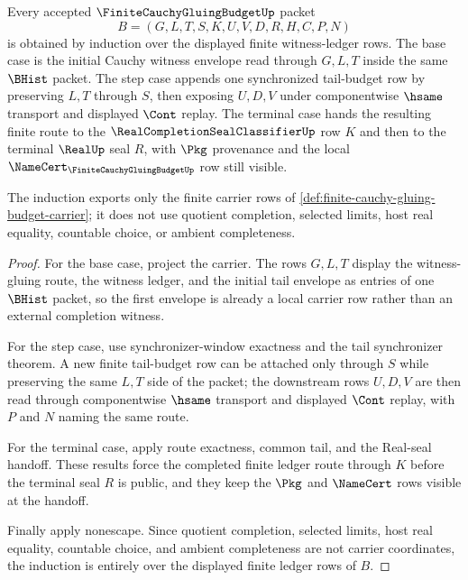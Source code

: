\begin{theorem}
\label{thm:finite-cauchy-gluing-budget-induction}
Every accepted $\FiniteCauchyGluingBudgetUp$ packet
$$
B=(G,L,T,S,K,U,V,D,R,H,C,P,N)
$$
is obtained by induction over the displayed finite witness-ledger rows. The base case is the initial Cauchy witness envelope read through $G,L,T$ inside the same $\BHist$ packet. The step case appends one synchronized tail-budget row by preserving $L,T$ through $S$, then exposing $U,D,V$ under componentwise $\hsame$ transport and displayed $\Cont$ replay. The terminal case hands the resulting finite route to the $\RealCompletionSealClassifierUp$ row $K$ and then to the terminal $\RealUp$ seal $R$, with $\Pkg$ provenance and the local $\NameCert_{\FiniteCauchyGluingBudgetUp}$ row still visible.

The induction exports only the finite carrier rows of \autoref{def:finite-cauchy-gluing-budget-carrier}; it does not use quotient completion, selected limits, host real equality, countable choice, or ambient completeness.
\end{theorem}
\begin{proof}
For the base case, project the carrier. The rows $G,L,T$ display the witness-gluing route, the witness ledger, and the initial tail envelope as entries of one $\BHist$ packet, so the first envelope is already a local carrier row rather than an external completion witness.

For the step case, use synchronizer-window exactness and the tail synchronizer theorem. A new finite tail-budget row can be attached only through $S$ while preserving the same $L,T$ side of the packet; the downstream rows $U,D,V$ are then read through componentwise $\hsame$ transport and displayed $\Cont$ replay, with $P$ and $N$ naming the same route.

For the terminal case, apply route exactness, common tail, and the Real-seal handoff. These results force the completed finite ledger route through $K$ before the terminal seal $R$ is public, and they keep the $\Pkg$ and $\NameCert$ rows visible at the handoff.

Finally apply nonescape. Since quotient completion, selected limits, host real equality, countable choice, and ambient completeness are not carrier coordinates, the induction is entirely over the displayed finite ledger rows of $B$.
\end{proof}

